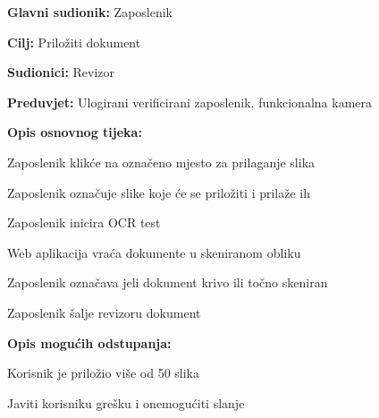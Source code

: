 					\noindent {}
					\begin{packed_item}
	
						\item \textbf{Glavni sudionik:} Zaposlenik
						\item  \textbf{Cilj:} Priložiti dokument
						\item  \textbf{Sudionici:} Revizor
						\item  \textbf{Preduvjet:} Ulogirani verificirani zaposlenik, funkcionalna kamera
						\item  \textbf{Opis osnovnog tijeka:}
						
						\item[] \begin{packed_enum}
	
							\item Zaposlenik klikće na označeno mjesto za prilaganje slika
							\item Zaposlenik označuje slike koje će se priložiti i prilaže ih
							\item Zaposlenik inicira OCR test
							\item Web aplikacija vraća dokumente u skeniranom obliku
							\item Zaposlenik označava jeli dokument krivo ili točno skeniran
							\item Zaposlenik šalje revizoru dokument
							
							
						\end{packed_enum}
						
						\item  \textbf{Opis mogućih odstupanja:}
						
						\item[] \begin{packed_item}
	
							\item[1.] Korisnik je priložio više od 50 slika
							\item[] \begin{packed_enum}
								
								\item Javiti korisniku grešku i onemogućiti slanje
								
							\end{packed_enum}
							
						\end{packed_item}
					\end{packed_item}
				
